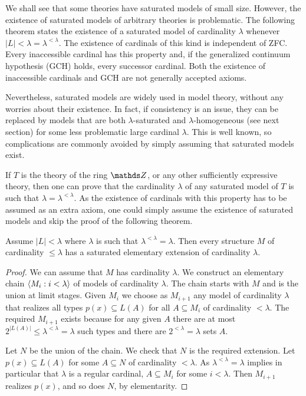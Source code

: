 We shall see that some theories have saturated models of small size.
However, the existence of saturated models of arbitrary theories is problematic.
The following theorem states the existence of a saturated model of cardinality $\lambda$ whenever $|L|<\lambda=\lambda^{<\lambda}$.
The existence of cardinals of this kind is independent of ZFC.
Every inaccessible cardinal has this property and, if the generalized continuum hypothesis (GCH) holds, every successor cardinal.
Both the existence of inaccessible cardinals and GCH are not generally accepted axioms.

Nevertheless, saturated models are widely used in model theory, without any worries about their existence.
In fact, if consistency is an issue, they can be replaced by models that are both $\lambda$-saturated and $\lambda$-homogeneous (see next section) for some less problematic large cardinal $\lambda$.
This is well known, so complications are commonly avoided by simply assuming that saturated models exist.

If $T$ is the theory of the ring $\ZZ$, or any other sufficiently expressive theory, then one can prove that the cardinality $\lambda$ of any saturated model of $T$ is such that $\lambda=\lambda^{<\lambda}$.
As the existence of cardinals with this property has to be assumed as an extra axiom, one could simply assume the existence of saturated models and skip the proof of the following theorem.

\begin{theorem}\label{thm_esistenza_staturo_card_inacc}
Assume $|L|<\lambda$ where $\lambda$ is such that $\lambda^{<\lambda}=\lambda$. Then every structure $M$ of cardinality $\le\lambda$ has a saturated elementary extension of cardinality $\lambda$.
\end{theorem}

\begin{proof}
We can assume that $M$ has cardinality $\lambda$. We construct an elementary chain $\langle M_i : i<\lambda\rangle$ of models of cardinality $\lambda$. The chain starts with $M$ and is the union at limit stages. Given $M_i$ we choose as $M_{i+1}$ any model of cardinality $\lambda$ that realizes all types $p(x)\subseteq L(A)$ for all $A\subseteq M_i$ of cardinality $<\lambda$. 
The required $M_{i+1}$ exists because for any given $A$ there are at most $2^{|L(A)|}\le\lambda^{<\lambda}=\lambda$ such types and there are $2^{<\lambda}=\lambda$ sets $A$.

Let $N$ be the union of the chain. We check that $N$ is the required extension. Let $p(x)\subseteq L(A)$ for some $A\subseteq N$ of cardinality $<\lambda$. As $\lambda^{<\lambda}=\lambda$ implies in particular that $\lambda$ is a regular cardinal, $A\subseteq M_i$ for some $i<\lambda$. Then $M_{i+1}$ realizes $p(x)$, and so does $N$, by elementarity.
\end{proof}

